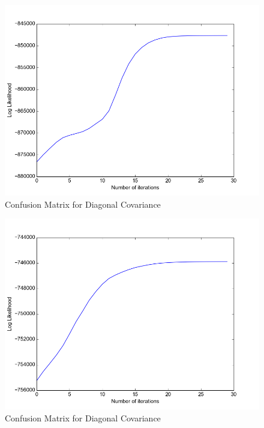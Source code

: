 \documentclass[11pt,a4paper]{article}
\begin{document}
\begin{minipage}[b]{0.5\textwidth}
\begin{figure}[H]
  \centering
  \includegraphics[width=.8\linewidth]{Figures/likelihood_digits2.png}
\caption{Confusion Matrix for Diagonal Covariance}
  \label{fig:sfig1}
\end{figure}%
\end{minipage}
\begin{minipage}[b]{0.5\textwidth}
\begin{figure}[H]
  \centering
  \includegraphics[width=.8\linewidth]{Figures/likelihood_digits3.png}
\caption{Confusion Matrix for Diagonal Covariance}
  \label{fig:sfig1}
\end{figure}%
\end{minipage}
\end{document}

